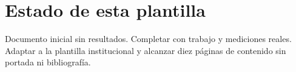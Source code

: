 \section*{Estado de esta plantilla}
Documento inicial sin resultados. Completar con trabajo y mediciones reales.
Adaptar a la plantilla institucional y alcanzar diez páginas de contenido sin portada ni bibliografía.
